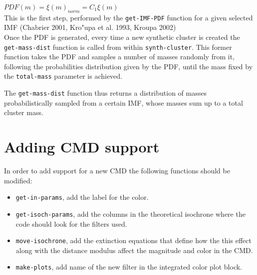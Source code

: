 \documentclass[10pt]{article}
\begin{document}
$PDF(m) = \xi(m)_{norm} = C_1 \xi(m) $\\

This is the first step, performed by the \texttt{get-IMF-PDF} function for a given selected
IMF (Chabrier 2001, Kro"upa et al. 1993, Kroupa 2002)\\


Once the PDF is generated, every time a new synthetic cluster is created the
\texttt{get-mass-dist} function is called from within \texttt{synth-cluster}. This
former function takes the PDF and samples a number of masses randomly from it, following
the probabilities distribution given by the PDF, until the mass fixed by the
\texttt{total-mass} parameter is achieved.

The \texttt{get-mass-dist} function thus returns a distribution of masses probabilistically
sampled from a certain IMF, whose masses sum up to a total cluster mass.


\section{Adding CMD support}

In order to add support for a new CMD the following functions should be modified:
\begin{itemize}
\item \texttt{get-in-params}, add the label for the color.
\item \texttt{get-isoch-params}, add the columns in the theoretical isochrone
where the code should look for the filters used.
\item \texttt{move-isochrone}, add the extinction equations that define how
the this effect along with the distance modulus affect the magnitude and color
in the CMD.
\item \texttt{make-plots}, add name of the new filter in the integrated color
plot block.
\end{itemize}
\end{document}
